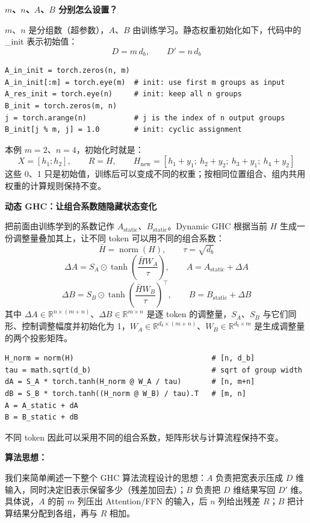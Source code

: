 \documentclass[11pt]{article}
\begin{document}
\textbf{$m$、$n$、$A$、$B$ 分别怎么设置？}

$m$、$n$ 是分组数（超参数），$A$、$B$ 由训练学习。静态权重初始化如下，代码中的 \_init 表示初始值：
\[
  D=m\,d_b,\qquad D'=n\,d_b
\]
\begin{verbatim}
A_in_init = torch.zeros(n, m)
A_in_init[:m] = torch.eye(m)  # init: use first m groups as input
A_res_init = torch.eye(n)     # init: keep all n groups
B_init = torch.zeros(m, n)
j = torch.arange(n)           # j is the index of n output groups
B_init[j % m, j] = 1.0        # init: cyclic assignment
\end{verbatim}

本例 $m=2$、$n=4$，初始化时就是：
\[
  X=[h_1;h_2],\qquad R=H,\qquad H_{\mathrm{new}}=[h_1+y_1;\ h_2+y_2;\ h_3+y_1;\ h_4+y_2]
\]
这些 0、1 只是初始值，训练后可以变成不同的权重；按相同位置组合、组内共用权重的计算规则保持不变。

\textbf{动态 GHC：让组合系数随隐藏状态变化}

把前面由训练学到的系数记作 $A_{\mathrm{static}}$、$B_{\mathrm{static}}$。Dynamic GHC 根据当前 $H$ 生成一份调整量叠加其上，让不同 token 可以用不同的组合系数：
\[
  \bar H=\operatorname{norm}(H),\qquad \tau=\sqrt{d_b}
\]
\[
  \Delta A=S_A\odot\tanh\!\left(\frac{\bar H W_A}{\tau}\right),\qquad A=A_{\mathrm{static}}+\Delta A
\]
\[
  \Delta B=S_B\odot\tanh\!\left(\frac{\bar H W_B}{\tau}\right)^{\top},\qquad B=B_{\mathrm{static}}+\Delta B
\]
其中 $\Delta A\in\mathbb{R}^{n\times(m+n)}$、$\Delta B\in\mathbb{R}^{m\times n}$ 是逐 token 的调整量，$S_A$、$S_B$ 与它们同形、控制调整幅度并初始化为 1，$W_A\in\mathbb{R}^{d_b\times(m+n)}$、$W_B\in\mathbb{R}^{d_b\times m}$ 是生成调整量的两个投影矩阵。

\begin{verbatim}
H_norm = norm(H)                                # [n, d_b]
tau = math.sqrt(d_b)                            # sqrt of group width
dA = S_A * torch.tanh(H_norm @ W_A / tau)       # [n, m+n]
dB = S_B * torch.tanh((H_norm @ W_B) / tau).T   # [m, n]
A = A_static + dA
B = B_static + dB
\end{verbatim}

不同 token 因此可以采用不同的组合系数，矩阵形状与计算流程保持不变。

\textbf{算法思想：}

我们来简单阐述一下整个 GHC 算法流程设计的思想：$A$ 负责把宽表示压成 $D$ 维输入，同时决定旧表示保留多少（残差加回去）；$B$ 负责把 $D$ 维结果写回 $D'$ 维。具体说，$A$ 的前 $m$ 列压出 Attention/FFN 的输入，后 $n$ 列给出残差 $R$；$B$ 把计算结果分配到各组，再与 $R$ 相加。
\end{document}
